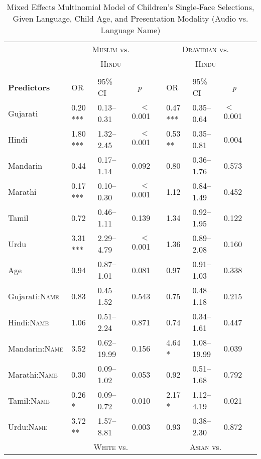 \begin{table}[ht]
\small
\caption{Mixed Effects Multinomial Model of Children's Single-Face Selections, Given Language, Child Age, and Presentation Modality (Audio vs. Language Name)}\label{tab:fpmod}
    \centering
    \vspace{5pt}
    \setlength{\tabcolsep}{1.75pt} 
\begin{threeparttable}
\begin{tabular}{lllrllllr}

 \toprule
& \multicolumn{3}{c}{\textsc{Muslim} vs.} & & \multicolumn{3}{c}{\textsc{Dravidian} vs.}\\
& \multicolumn{3}{c}{\textsc{Hindu}\tnote{a}} & & \multicolumn{3}{c}{\textsc{Hindu}\tnote{a}}\\
\cline{2-4} \cline{6-8} \\[-.75em]
\textbf{Predictors} & OR & 95\% CI & \multicolumn{1}{c}{\textit{p}} & & OR & 95\% CI & \multicolumn{1}{c}{\textit{p}} \\ 
\midrule
Gujarati & 0.20 *** & 0.13--0.31 & $<$0.001 &  & 0.47 *** & 0.35--0.64 & $<$0.001 \\ 
Hindi & 1.80 *** & 1.32--2.45 & $<$0.001 &  & 0.53 ** & 0.35--0.81 & 0.004 \\ 
Mandarin & 0.44 & 0.17--1.14 & 0.092 &  & 0.80 & 0.36--1.76 & 0.573 \\ 
Marathi & 0.17 *** & 0.10--0.30 & $<$0.001 &  & 1.12 & 0.84--1.49 & 0.452 \\ 
Tamil & 0.72 & 0.46--1.11 & 0.139 &  & 1.34 & 0.92--1.95 & 0.122 \\ 
Urdu & 3.31 *** & 2.29--4.79 & $<$0.001 &  & 1.36 & 0.89--2.08 & 0.160 \\ 
Age\tnote{b} & 0.94 & 0.87--1.01 & 0.081 &  & 0.97 & 0.91--1.03 & 0.338 \\ 
Gujarati:\textsc{Name} & 0.83 & 0.45--1.52 & 0.543 &  & 0.75 & 0.48--1.18 & 0.215 \\ 
Hindi:\textsc{Name} & 1.06 & 0.51--2.24 & 0.871 &  & 0.74 & 0.34--1.61 & 0.447 \\ 
Mandarin:\textsc{Name} & 3.52 & 0.62--19.99 & 0.156 &  & 4.64 * & 1.08--19.99 & 0.039 \\ 
Marathi:\textsc{Name} & 0.30 & 0.09--1.02 & 0.053 &  & 0.92 & 0.51--1.68 & 0.792 \\ 
Tamil:\textsc{Name} & 0.26 * & 0.09--0.72 & 0.010 &  & 2.17 * & 1.12--4.19 & 0.021 \\ 
Urdu:\textsc{Name} & 3.72 ** & 1.57--8.81 & 0.003 &  & 0.93 & 0.38--2.30 & 0.872 \\ 
\midrule
& 
\multicolumn{3}{c}{\textsc{White} vs.} & &
\multicolumn{3}{c}{\textsc{Asian} vs.}\\


\end{tabular}
\end{threeparttable}
\end{table}
